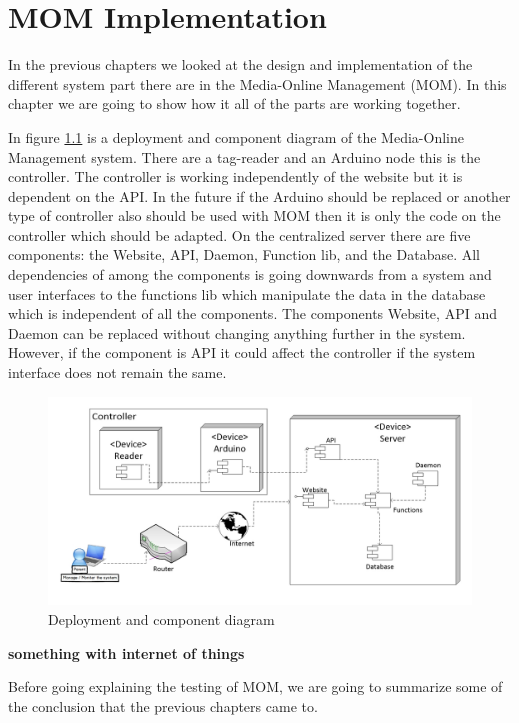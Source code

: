 \chapter{MOM Implementation}

In the previous chapters we looked at the design and implementation of the different system part there are in the Media-Online Management (MOM).
In this chapter we are going to show how it all of the parts are working together.

In figure \ref{fig:deployment} is a deployment and component diagram of the Media-Online Management system. There are a tag-reader and an Arduino node this is the controller. The controller is working independently of the website but it is dependent on the API. In the future if the Arduino should be replaced or another type of controller also should be used with MOM then it is only the code on the controller which should be adapted. 
On the centralized server there are five components: the Website, API, Daemon, Function lib, and the Database. All dependencies of among the components is going downwards from a system and user interfaces to the functions lib which manipulate the data in the database which is independent of all the components.
 The components Website, API and Daemon can be replaced without changing anything further in the system. However, if the component is API it could affect the controller if the system interface does not remain the same.
    
\begin{figure}
	\centering
		\includegraphics[width=1.50\textwidth, angle=90 ]{images/deployment.jpg}
	\caption{Deployment and component diagram}
	\label{fig:deployment}
\end{figure}

\textbf{something with internet of things}

Before going explaining the testing of MOM, we are going to summarize some of the conclusion that the previous chapters came to.

